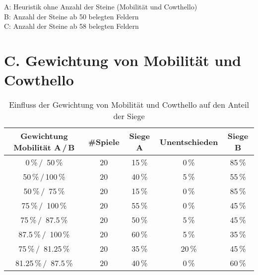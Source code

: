 \small{
A: Heuristik ohne Anzahl der Steine (Mobilität und Cowthello) \\
B: Anzahl der Steine ab 50 belegten Feldern \\
C: Anzahl der Steine ab 58 belegten Feldern}

\pagebreak

\section*{C. Gewichtung von Mobilität und Cowthello}
 
\setcounter{table}{0}
\renewcommand{\thetable}{C\arabic{table}}

\begin{table}[hb]
\centering
\begin{tabular}{c|c|ccc}
\hline
Gewichtung Mobilität A\,/\,B & \#Spiele & Siege A & Unentschieden & Siege B \\
\hline
   0\,\%\,/\, 50\,\% & 20 &  15\,\% &  0\,\% &85\,\% \\
  50\,\%\,/\,100\,\% & 20 & 40\,\% &  5\,\% &  55\,\% \\
  50\,\%\,/\, 75\,\% & 20 & 15\,\% &  0\,\% & 85\,\% \\
  75\,\%\,/\, 100\,\% & 20 & 55\,\% &  0\,\% & 45\,\% \\
  75\,\%\,/\, 87.5\,\% & 20 & 50\,\% &  5\,\% & 45\,\% \\
  87.5\,\%\,/\, 100\,\% & 20 & 60\,\% &  5\,\% & 35\,\% \\
  75\,\%\,/\, 81.25\,\% & 20 & 35\,\% &  20\,\% & 45\,\% \\
  81.25\,\%\,/\, 87.5\,\% & 20 & 40\,\% &  0\,\% & 60\,\% \\
\hline
\end{tabular}
\caption{Einfluss der Gewichtung von Mobilität und Cowthello auf den Anteil der Siege}
\label{table:combinedweighting}
\end{table}

\pagebreak

